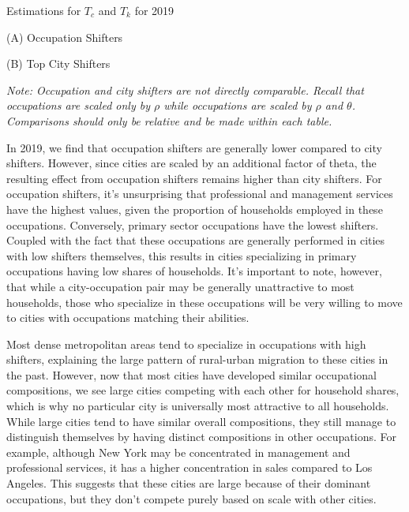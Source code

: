 \documentclass[10pt]{article}
\begin{document}
\begin{table}[!htb]
    \centering
    \caption{Estimations for $T_c$ and $T_k$ for 2019}
    \begin{minipage}{0.4\textwidth}
        \centering
        \caption*{(A) Occupation Shifters}
        
    \end{minipage}
    \hfill
    \begin{minipage}{0.55\textwidth}
        \centering
        \caption*{(B) Top City Shifters}
        
    \end{minipage}
    \caption*{\small\textit{Note: Occupation and city shifters are not directly comparable. Recall that occupations are scaled only by $\rho$ while occupations are scaled by $\rho$ and $\theta$. Comparisons should only be relative and be made within each table.}}
\end{table}

In 2019, we find that occupation shifters are generally lower compared to city shifters. However, since cities are scaled by an additional factor of theta, the resulting effect from occupation shifters remains higher than city shifters. For occupation shifters, it's unsurprising that professional and management services have the highest values, given the proportion of households employed in these occupations. Conversely, primary sector occupations have the lowest shifters. Coupled with the fact that these occupations are generally performed in cities with low shifters themselves, this results in cities specializing in primary occupations having low shares of households. It's important to note, however, that while a city-occupation pair may be generally unattractive to most households, those who specialize in these occupations will be very willing to move to cities with occupations matching their abilities.

Most dense metropolitan areas tend to specialize in occupations with high shifters, explaining the large pattern of rural-urban migration to these cities in the past. However, now that most cities have developed similar occupational compositions, we see large cities competing with each other for household shares, which is why no particular city is universally most attractive to all households. While large cities tend to have similar overall compositions, they still manage to distinguish themselves by having distinct compositions in other occupations. For example, although New York may be concentrated in management and professional services, it has a higher concentration in sales compared to Los Angeles. This suggests that these cities are large because of their dominant occupations, but they don't compete purely based on scale with other cities.
\end{document}
